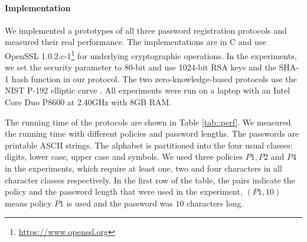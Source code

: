 \paragraph{Implementation}
We implemented a prototypes of all three password registration protocols and measured their real performance. 
The implementations are in C and use OpenSSL 1.0.2.c-1\footnote{\url{https://www.openssl.org}} for underlying cryptographic operations. 
In the experiments, we set the security parameter to 80-bit and use 1024-bit RSA keys and the \mbox{{SHA-}1} hash function in our protocol. 
The two zero-knowledge-based protocols use the \ac{NIST} P-192 elliptic curve \cite{nistEC}.
All experiments were run on a laptop with an Intel Core Duo P8600 at 2.40GHz with 8GB RAM.

\begin{table}[!t]
\begin{center}
\caption{Protocol Performance (Running Time in Milliseconds)} \label{tab::perf}
\end{center}
\end{table} 

The running time of the protocols are shown in Table \ref{tab::perf}. We measured the running time with different policies and password lengths. The passwords are printable \ac{ASCII} strings. 
The alphabet is partitioned into the four usual classes: digits, lower case, upper case and symbols. 
We used three policies $P1, P2$ and $P4$ in the experiments, which require at least one, two and four characters in all character classes respectively. 
In the first row of the table, the pairs indicate the policy and the password length that were used in the experiment, \eg $(P1, 10)$ means policy $P1$ is used and the password was $10$ characters long. 

